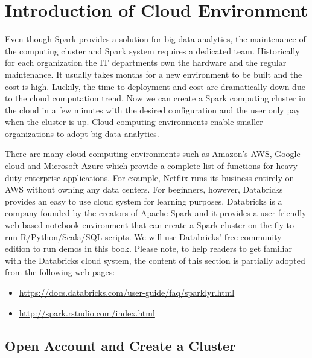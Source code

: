 \documentclass[
  12pt,
]{krantz}
\providecommand{\tightlist}{%
  \setlength{\itemsep}{0pt}\setlength{\parskip}{0pt}}
\begin{document}
\hypertarget{CloudEnvironment}{%
\section{Introduction of Cloud Environment}\label{CloudEnvironment}}

Even though Spark provides a solution for big data analytics, the maintenance of the computing cluster and Spark system requires a dedicated team. Historically for each organization the IT departments own the hardware and the regular maintenance. It usually takes months for a new environment to be built and the cost is high. Luckily, the time to deployment and cost are dramatically down due to the cloud computation trend. Now we can create a Spark computing cluster in the cloud in a few minutes with the desired configuration and the user only pay when the cluster is up. Cloud computing environments enable smaller organizations to adopt big data analytics.

There are many cloud computing environments such as Amazon's AWS, Google cloud and Microsoft Azure which provide a complete list of functions for heavy-duty enterprise applications. For example, Netflix runs its business entirely on AWS without owning any data centers. For beginners, however, Databricks provides an easy to use cloud system for learning purposes. Databricks is a company founded by the creators of Apache Spark and it provides a user-friendly web-based notebook environment that can create a Spark cluster on the fly to run R/Python/Scala/SQL scripts. We will use Databricks' free community edition to run demos in this book. Please note, to help readers to get familiar with the Databricks cloud system, the content of this section is partially adopted from the following web pages:

\begin{itemize}
\tightlist
\item
  \url{https://docs.databricks.com/user-guide/faq/sparklyr.html}
\item
  \url{http://spark.rstudio.com/index.html}
\end{itemize}

\hypertarget{open-account-and-create-a-cluster}{%
\subsection{Open Account and Create a Cluster}\label{open-account-and-create-a-cluster}}
\end{document}
